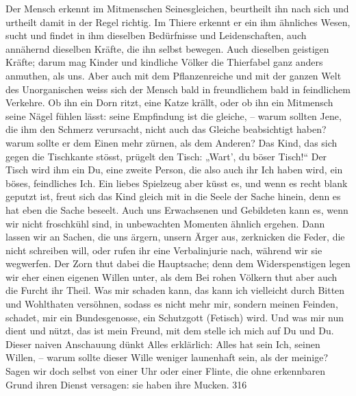 Der Mensch erkennt im Mitmenschen Seinesgleichen, beurtheilt ihn nach sich und urtheilt damit in der Regel richtig. Im Thiere erkennt er ein ihm ähnliches Wesen, sucht und findet in ihm dieselben Bedürfnisse und Leidenschaften, auch annähernd dieselben Kräfte, die ihn selbst bewegen. Auch dieselben geistigen Kräfte; darum mag Kinder und kindliche Völker die Thierfabel ganz anders anmuthen, als uns. Aber auch mit dem Pflanzenreiche und mit der ganzen Welt des Unorganischen weiss sich der Mensch bald in freundlichem bald in feindlichem Verkehre. Ob ihn ein Dorn ritzt, eine Katze krällt, oder ob ihn ein Mitmensch seine Nägel fühlen lässt: seine Empfindung ist die gleiche, – warum sollten Jene, die ihm den Schmerz verursacht, nicht auch das Gleiche beabsichtigt haben? warum sollte er dem Einen mehr zürnen, \label{fp.306} als dem Anderen? Das Kind, das sich gegen die Tischkante stösst, prügelt den Tisch: „Wart’, du böser Tisch!“ Der Tisch wird ihm ein Du, eine zweite Person, die also auch ihr Ich haben wird, ein böses, feindliches Ich. Ein liebes Spielzeug aber küsst es, und wenn es recht blank geputzt ist, freut sich das Kind gleich mit in die Seele der Sache hinein, denn es hat eben die Sache beseelt. Auch uns Erwachsenen und Gebildeten kann es, wenn wir nicht froschkühl sind, in unbewachten Momenten ähnlich ergehen. Dann lassen wir an Sachen, die uns ärgern, unsern Ärger aus, zerknicken die Feder, die nicht schreiben will, oder rufen ihr eine Verbalinjurie nach, während wir sie wegwerfen. Der Zorn thut dabei die Hauptsache; denn dem Widerspenstigen legen wir eher einen eigenen Willen unter, als dem  Bei rohen Völkern thut aber auch die Furcht ihr Theil. Was mir schaden kann, das kann ich vielleicht durch Bitten und Wohlthaten versöhnen, sodass es nicht mehr mir, sondern meinen Feinden, schadet, mir ein Bundesgenosse, ein Schutzgott (Fetisch) wird. Und was mir nun dient und nützt, das ist mein Freund, mit dem stelle ich mich auf Du und Du. Dieser naiven Anschauung dünkt Alles erklärlich: Alles hat sein Ich, seinen Willen, – warum sollte dieser Wille weniger launenhaft sein, als der meinige? Sagen wir doch selbst von einer Uhr oder einer Flinte, die ohne erkennbaren Grund ihren Dienst versagen: sie haben ihre Mucken.  {\textbar}{\textbar}316{\textbar}{\textbar}\label{sp.316} 

